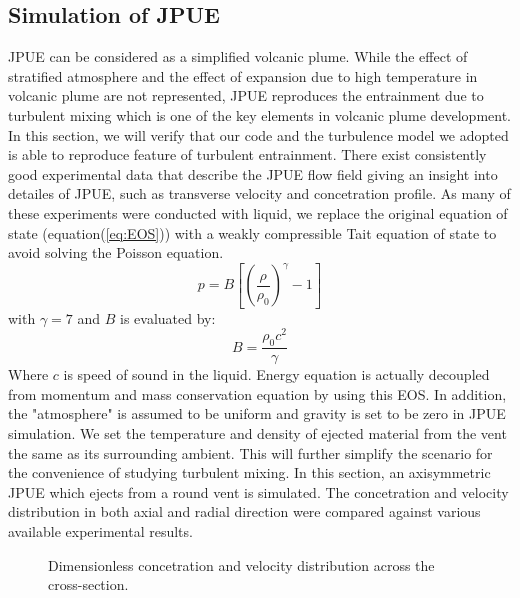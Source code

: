 \documentclass[10pt,a4paper]{article}
\begin{document}
\subsection{Simulation of JPUE}
JPUE can be considered as a simplified volcanic plume. While the effect of stratified atmosphere and the effect of expansion due to high temperature in volcanic plume are not represented, JPUE reproduces the entrainment due to turbulent mixing which is one of the key elements in volcanic plume development. In this section, we will verify that our code and the turbulence model we adopted is able to reproduce feature of turbulent entrainment.
There exist consistently good experimental data \cite{papanicolaou1988investigations, list1982turbulent, dimotakis1983structure} that describe the JPUE flow field giving an insight into detailes of JPUE, such as transverse velocity and concetration profile.
As many of these experiments were conducted with liquid, we replace the original equation of state (equation(\ref{eq:EOS})) with a weakly compressible Tait equation of state \cite{becker2007weakly} to avoid solving the Poisson equation.
\begin{equation}
p=B[(\dfrac{\rho}{\rho_0})^{\gamma}-1]
\end{equation}
with $\gamma=7$ and $B$ is evaluated by:
\begin{equation}
B=\dfrac{\rho_0 c^2}{\gamma}
\end{equation}
Where $c$ is speed of sound in the liquid. Energy equation is actually decoupled from momentum and mass conservation equation by using this EOS. In addition, the "atmosphere" is assumed to be uniform and gravity is set to be zero in JPUE simulation. We set the temperature and density of ejected material from the vent the same as its surrounding ambient. This will further simplify the scenario for the convenience of studying turbulent mixing.
In this section, an axisymmetric JPUE which ejects from a round vent is simulated. The concetration and velocity distribution in both axial and radial direction were compared against various available experimental results.
\begin{figure}
\hfill
{}
\hfill
{}
\hfill
\caption{Dimensionless concetration and velocity distribution across the cross-section.}
\label{fig:JPUE_cross-section}
\end{figure}
\end{document}
